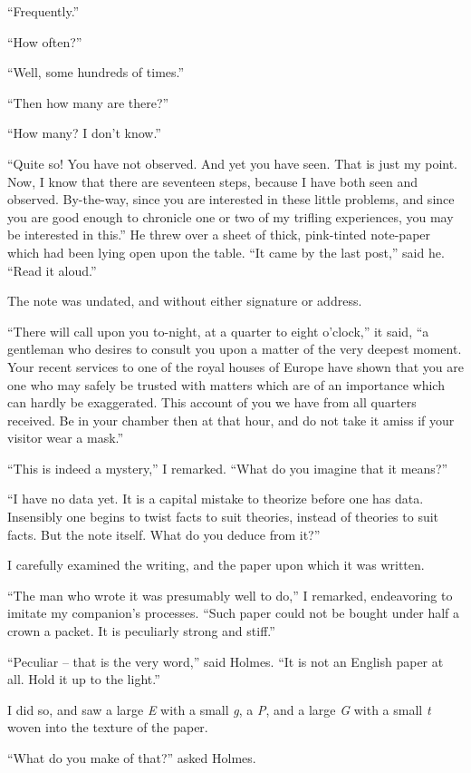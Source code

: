 “Frequently.”

“How often?”

“Well, some hundreds of times.”

“Then how many are there?”

“How many? I don’t know.”

“Quite so! You have not observed. And yet you have
seen. That is just my point. Now, I know that there are
seventeen steps, because I have both seen and observed. By-the-way,
since you are interested in these little problems, and
since you are good enough to chronicle one or two of my
trifling experiences, you may be interested in this.” He threw
over a sheet of thick, pink-tinted note-paper which had been
lying open upon the table. “It came by the last post,” said
he. “Read it aloud.”

The note was undated, and without either signature or
address.

“There will call upon you to-night, at a quarter to eight
o’clock,” it said, “a gentleman who desires to consult you
upon a matter of the very deepest moment. Your recent services
to one of the royal houses of Europe have shown that
you are one who may safely be trusted with matters which are
of an importance which can hardly be exaggerated. This
account of you we have from all quarters received. Be in
your chamber then at that hour, and do not take it amiss if
your visitor wear a mask.”

“This is indeed a mystery,” I remarked. “What do you
imagine that it means?”

“I have no data yet. It is a capital mistake to theorize
before one has data. Insensibly one begins to twist facts to
suit theories, instead of theories to suit facts. But the note
itself. What do you deduce from it?”

I carefully examined the writing, and the paper upon which
it was written.

“The man who wrote it was presumably well to do,” I
remarked, endeavoring to imitate my companion’s processes.
“Such paper could not be bought under half a crown a
packet. It is peculiarly strong and stiff.”

“Peculiar -- that is the very word,” said Holmes. “It is
not an English paper at all. Hold it up to the light.”

I did so, and saw a large \textit{E} with a small \textit{g}, a \textit{P}, and a large
\textit{G} with a small \textit{t} woven into the texture of the paper.

“What do you make of that?” asked Holmes.

